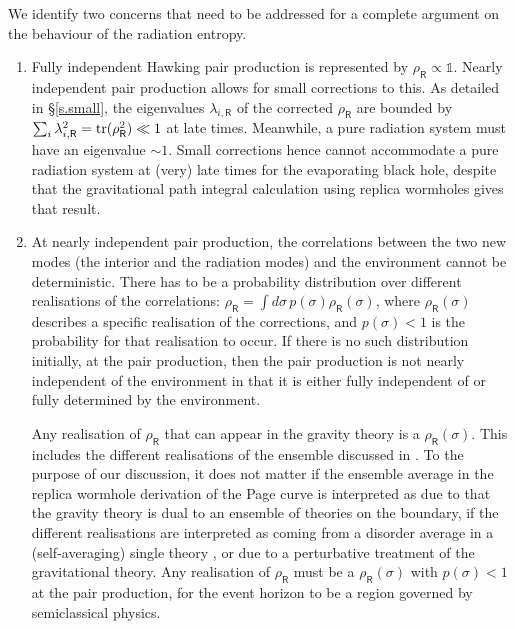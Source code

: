 \documentclass[11pt]{article}
\numberwithin{equation}{section}
\begin{document}
We identify two concerns that need to be addressed for a complete argument on the behaviour of the radiation entropy.
\begin{enumerate}
\item Fully independent Hawking pair production is represented by $\rho_\textsf{R}\propto \mathbb{1}$. Nearly independent pair production allows for small corrections to this. As detailed in \S\ref{s.small}, the eigenvalues $\lambda_{i,\textsf{R}}$ of the corrected $\rho_\textsf{R}$ are bounded by $\sum_i \lambda_{i,\textsf{R}}^2={\rm tr}(\rho_\textsf{R}^2)\ll1$ at late times. Meanwhile, a pure radiation system must have an eigenvalue $\sim 1$. Small corrections hence cannot accommodate a pure radiation system at (very) late times for the evaporating black hole, despite that the gravitational path integral calculation using replica wormholes gives that result.
\item At nearly independent pair production, the correlations between the two new modes (the interior and the radiation modes) and the environment cannot be deterministic. There has to be a probability distribution over different realisations of the correlations: $\rho_\textsf{R}=\int d\sigma \,p(\sigma)\rho_\textsf{R}(\sigma)$, where $\rho_\textsf{R}(\sigma)$ describes a specific realisation of the corrections, and $p(\sigma)<1$ is the probability for that realisation to occur. If there is no such distribution initially, at the pair production, then the pair production is not nearly independent of the environment in that it is either fully independent of or fully determined by the environment.

Any realisation of $\rho_\textsf{R}$ that can appear in the gravity theory is a $\rho_\textsf{R}(\sigma)$. This includes the different realisations of the ensemble discussed in \cite{Penington:2019kki}. To the purpose of our discussion, it does not matter if the ensemble average in the replica wormhole derivation of the Page curve is interpreted as due to that the gravity theory is dual to an ensemble of theories on the boundary, if the different realisations are interpreted as coming from a disorder average in a (self-averaging) single theory \cite{Pollack:2020gfa}, or due to a perturbative treatment of the gravitational theory. Any realisation of $\rho_\textsf{R}$ must be a $\rho_\textsf{R}(\sigma)$ with $p(\sigma)<1$ at the pair production, for the event horizon to be a region governed by semiclassical physics.


\end{enumerate}
\end{document}
